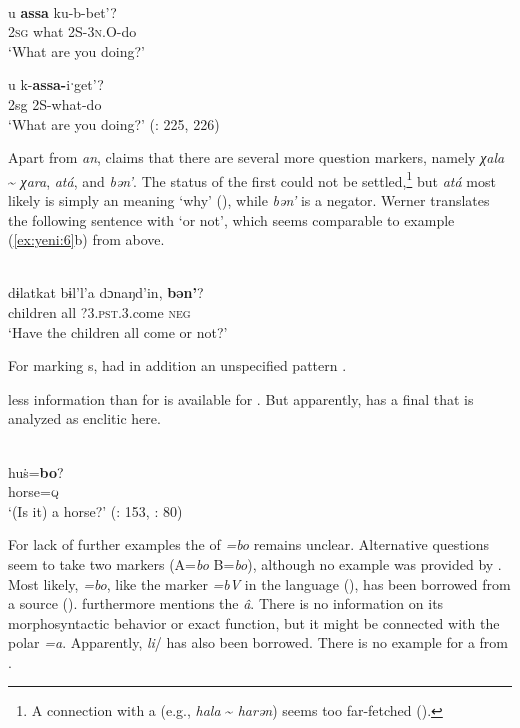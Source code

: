 \ea%
    \label{ex:yeni:9}
    \\
    \ea
    \gll u \textbf{{assa}} ku-b-bet’?\\
    2\textsc{sg}  what  2S-3\textsc{n}.O-do\\
    \glt ‘What are you doing?’
    
    \ex
    \gll u  k-\textbf{{assa-}}{iˑget’?}\\
    2sg  2S-what-do\\
    \glt ‘What are you doing?’ (\citealt{Werner1997b}: 225, 226)
    \z
    \z

Apart from \textit{an}, \citet[214]{Werner1997b} claims that there are several more question markers, namely \textit{χala} {\textasciitilde} \textit{χara}, \textit{atá}, and \textit{bən’}. The status of the first could not be settled,\footnote{A connection with a   (e.g.,  \textit{hala} {\textasciitilde} \textit{harən}) seems too far-fetched ().} but \textit{atá} most likely is simply an  meaning ‘why’ (), while \textit{bən’} is a negator. Werner translates the following sentence with ‘or not’, which seems comparable to example (\ref{ex:yeni:6}b) from  above.

\ea%
    \label{ex:yeni:10}
    \\
    \gll dɨlatkat  bɨl’l’a  dɔnaŋd’in, \textbf{{bən’}}?\\
    children  all  ?3.\textsc{pst}.3.come    \textsc{neg}\\
    \glt ‘Have the children all come or not?’ \citep[225]{Werner1997b}
    \z

\noindent For marking s,  had in addition an unspecified  pattern \citep[225]{Werner1997b}.

 less information than for   is available for . But apparently,  has a final  that is analyzed as enclitic here.

\ea%
    \label{ex:yeni:11}
    \\
    \gll huṡ=\textbf{{bo}}?\\
    horse=\textsc{q}\\
    \glt ‘(Is it) a horse?’ (\citealt{Castrén1858}: 153, \citealt{Werner1997c}: 80)
    \z

\noindent For lack of further examples the  of \textit{=bo} remains unclear. Alternative questions seem to take two markers (A=\textit{bo} B=\textit{bo}), although no example was provided by \cite[153]{Castrén1858}. Most likely, \textit{=bo}, like the marker \textit{=bV} in the  language  (), has been borrowed from a  source (). \cite[154]{Castrén1858} furthermore mentions the   \textit{â}. There is no information on its morphosyntactic behavior or exact function, but it might be connected with the  polar  \textit{=a}. Apparently,  \textit{li}/ has also been borrowed. There is no example for a  from .

